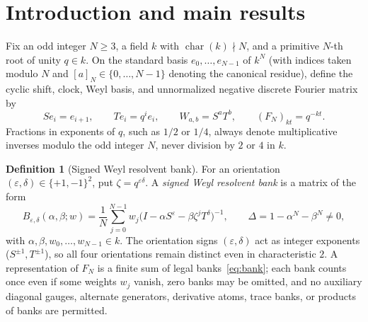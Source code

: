 \documentclass[11pt,reqno]{amsart}
\numberwithin{equation}{section}
\theoremstyle{definition}
\newtheorem{definition}[theorem]{Definition}
\theoremstyle{remark}
\newcommand{\res}[1]{[#1]_N}
\newcommand{\eps}{\varepsilon}
\begin{document}
\begin{abstract}
\begin{enumerate}[label=(\arabic*),leftmargin=1.8em]
\item \emph{Deterministic cubic-time coefficient generation:} Via an amortized reverse-GCD descent lemma for scalar-span coprime polynomial selection requiring $O((s+v)L^2)$ field operations and $O((s+v)L)$ inversions, we construct a legal monic degree-$(N-d)$ generator polynomial $g$ in the $N\ge 6d-2$ range deterministically in $O(N^3)$ coefficient-field operations, $O(N^2)$ inversions, and $O(N^2)$ storage (while explicitly separating and accounting for splitting-field, root-recovery, and warm application costs; no FFT speedup is claimed).
\end{enumerate}
\end{abstract}

\maketitle

\section{Introduction and main results}
\label{sec:intro}

Fix an odd integer $N\ge 3$, a field $k$ with $\operatorname{char}(k)\nmid N$, and a primitive $N$-th root of unity $q\in k$. On the standard basis $e_0,\ldots,e_{N-1}$ of $k^N$ (with indices taken modulo $N$ and $\res{a}\in\{0,\ldots,N-1\}$ denoting the canonical residue), define the cyclic shift, clock, Weyl basis, and unnormalized negative discrete Fourier matrix by
\begin{equation}
\label{eq:weyl-def}
Se_i = e_{i+1},\qquad Te_i = q^i e_i,\qquad W_{a,b} = S^a T^b,\qquad (F_N)_{kt} = q^{-kt}.
\end{equation}
Fractions in exponents of $q$, such as $1/2$ or $1/4$, always denote multiplicative inverses modulo the odd integer $N$, never division by $2$ or $4$ in $k$.

\begin{definition}[Signed Weyl resolvent bank]
\label{def:bank}
For an orientation $(\eps,\delta)\in\{+1,-1\}^2$, put $\zeta = q^{\eps\delta}$. A \emph{signed Weyl resolvent bank} is a matrix of the form
\begin{equation}
\label{eq:bank}
B_{\eps,\delta}(\alpha,\beta;w)
= \frac{1}{N}\sum_{j=0}^{N-1} w_j\bigl(I - \alpha S^\eps - \beta\zeta^j T^\delta\bigr)^{-1},
\qquad \Delta = 1 - \alpha^N - \beta^N \ne 0,
\end{equation}
with $\alpha,\beta,w_0,\ldots,w_{N-1}\in k$. The orientation signs $(\eps,\delta)$ act as integer exponents ($S^{\pm 1}, T^{\pm 1}$), so all four orientations remain distinct even in characteristic $2$. A representation of $F_N$ is a finite sum of legal banks~\eqref{eq:bank}; each bank counts once even if some weights $w_j$ vanish, zero banks may be omitted, and no auxiliary diagonal gauges, alternate generators, derivative atoms, trace banks, or products of banks are permitted.
\end{definition}
\end{document}
